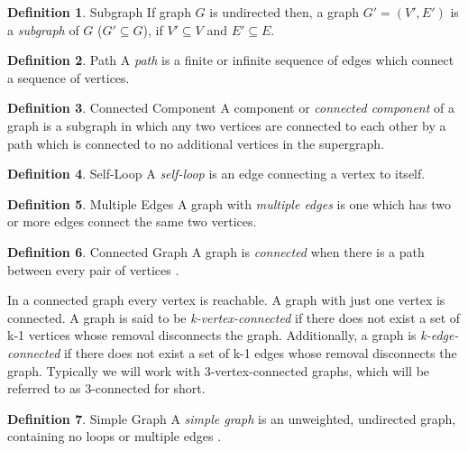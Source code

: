 \documentclass[11pt]{article}
\theoremstyle{definition}
\newtheorem{definition}{Definition}[section]
\begin{document}
	\theoremstyle{definition}
	\begin{definition}{Subgraph}
			If graph $G$ is undirected then, a graph $G' = (V',E')$ is a \emph{subgraph} of $G$ ($G' \subseteq G$), if $V' \subseteq V$ and $E' \subseteq E$.
  	\end{definition}

	\theoremstyle{definition}
	\begin{definition}{Path}
		A \emph{path} is a finite or infinite sequence of edges which connect a sequence of vertices.
	\end{definition}
	
	\theoremstyle{definition}
  	\begin{definition}{Connected Component}
		A component or \emph{connected component} of a graph is a subgraph in which any two vertices are connected to each other by a path which is connected to no additional vertices in the supergraph.
	\end{definition}
	
	\theoremstyle{definition}
	\begin{definition}{Self-Loop}
  		A \emph{self-loop} is an edge connecting a vertex to itself.
  	\end{definition}
	
	\theoremstyle{definition}
	\begin{definition}{Multiple Edges}
  		A graph with \emph{multiple edges} is one which has two or more edges connect the same two vertices.
	\end{definition}
	
	\theoremstyle{definition}
	\begin{definition}{Connected Graph}
		A graph is \emph{connected} when there is a path between every pair of vertices \cite{mathworld:ConnectedGraphs}. 
	\end{definition}

	In a connected graph every vertex is reachable. A graph with just one vertex is connected. 
	A graph is said to be \emph{k-vertex-connected} if there does not exist a set of k-1 vertices whose removal disconnects the graph. 
	Additionally, a graph is \emph{k-edge-connected} if there does not exist a set of k-1 edges whose removal disconnects the graph. 
	Typically we will work with 3-vertex-connected graphs, which will be referred to as 3-connected for short.

	\theoremstyle{definition}
	\begin{definition}{Simple Graph}  
  		A \emph{simple graph} is an unweighted, undirected graph, containing no loops or multiple edges \cite{mathworld:SimpleGraphs}. 
	\end{definition}
	
\end{document}
